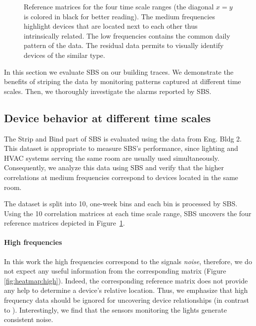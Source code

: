 \begin{figure}[t!]
\caption{Reference matrices for the four time scale ranges (the diagonal $x=y$ is colored in black for better reading). The medium frequencies highlight devices that are located next to each other thus intrinsically related. The low frequencies contains the common daily pattern of the data. The residual data permits to visually identify devices of the similar type.}
\label{fig:heatmap}
\end{figure}

In this section we evaluate SBS on our building traces.  We demonstrate
 the benefits of striping the data by monitoring patterns captured at different time scales.
Then, we thoroughly investigate the alarms reported by SBS.  

\subsection{Device behavior at different time scales}
The Strip and Bind part of SBS is evaluated using the data from Eng. Bldg 2. %
This dataset is appropriate to measure SBS's performance, since lighting and HVAC systems serving the same room are usually used 
simultaneously.
Consequently, we analyze this data using SBS and verify that the higher correlations at medium frequencies correspond to devices located in the same room. %

The dataset is split into 10, one-week bins and each bin is processed by SBS.
Using the 10 correlation matrices at each time scale range, SBS uncovers the four reference matrices depicted in 
Figure~\ref{fig:heatmap}.

\paragraph{High frequencies}
In this work the high frequencies correspond to the signals \emph{noise}, 
therefore, we do not expect any useful information from the corresponding matrix (Figure \ref{fig:heatmap:high}).
Indeed, the corresponding reference matrix does not provide any help to determine a device's relative location.
Thus, we emphasize that high frequency data should be ignored for uncovering device relationships (in contrast to \cite{romain:iotapp12}).
Interestingly, we find that the sensors monitoring the lights generate consistent noise. %
  
